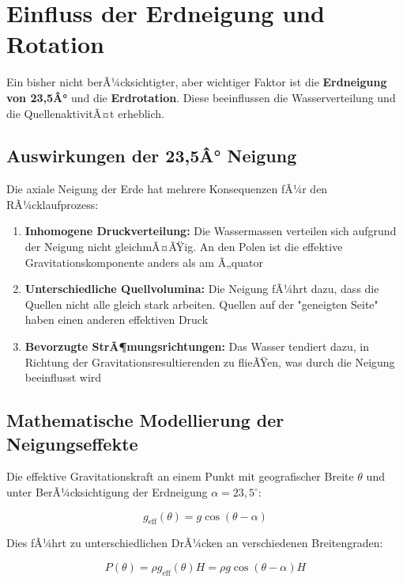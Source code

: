 ﻿\documentclass[12pt,a4paper]{report}
\begin{document}
\section{Einfluss der Erdneigung und Rotation}

Ein bisher nicht berÃ¼cksichtigter, aber wichtiger Faktor ist die \textbf{Erdneigung von 23,5Â°} und die \textbf{Erdrotation}. Diese beeinflussen die Wasserverteilung und die QuellenaktivitÃ¤t erheblich.

\subsection{Auswirkungen der 23,5Â° Neigung}

Die axiale Neigung der Erde hat mehrere Konsequenzen fÃ¼r den RÃ¼cklaufprozess:

\begin{enumerate}
	\item \textbf{Inhomogene Druckverteilung:} Die Wassermassen verteilen sich aufgrund der Neigung nicht gleichmÃ¤ÃŸig. An den Polen ist die effektive Gravitationskomponente anders als am Ã„quator
	
	\item \textbf{Unterschiedliche Quellvolumina:} Die Neigung fÃ¼hrt dazu, dass die Quellen nicht alle gleich stark arbeiten. Quellen auf der "geneigten Seite" haben einen anderen effektiven Druck
	
	\item \textbf{Bevorzugte StrÃ¶mungsrichtungen:} Das Wasser tendiert dazu, in Richtung der Gravitationsresultierenden zu flieÃŸen, was durch die Neigung beeinflusst wird
\end{enumerate}

\subsection{Mathematische Modellierung der Neigungseffekte}

Die effektive Gravitationskraft an einem Punkt mit geografischer Breite $\theta$ und unter BerÃ¼cksichtigung der Erdneigung $\alpha = 23{,}5^\circ$:

\begin{equation}
	g_{\text{eff}}(\theta) = g \cos(\theta - \alpha)
\end{equation}

Dies fÃ¼hrt zu unterschiedlichen DrÃ¼cken an verschiedenen Breitengraden:

\begin{equation}
	P(\theta) = \rho g_{\text{eff}}(\theta) H = \rho g \cos(\theta - \alpha) H
\end{equation}
\end{document}
